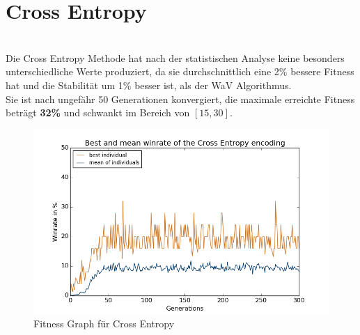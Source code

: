             \section{Cross Entropy}
                \begin{multicols}{2}
                    \noindent
                    \\[5mm]
                    Die Cross Entropy Methode hat nach der statistischen Analyse keine besonders unterschiedliche Werte produziert, da sie durchschnittlich eine 2\% bessere Fitness hat und die Stabilität um 1\% besser ist, als der WaV Algorithmus.\\[2mm]
                    Sie ist nach ungefähr 50 Generationen konvergiert, die maximale erreichte Fitness beträgt \textbf{32\%} und schwankt im Bereich von $[15,30]$. 
                    \begin{figure}[H]
                       \includegraphics[scale=0.5]{../pictures/summary/cross-entropy-fitness.png}
                       \caption{Fitness Graph für Cross Entropy}\label{fig:graph-ce}
                    \end{figure}
                \end{multicols}

